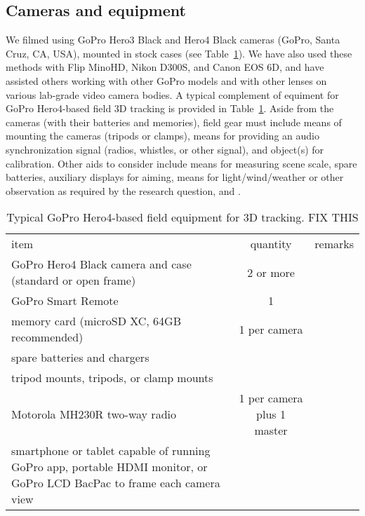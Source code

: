 \documentclass[fleqn,10pt]{wlpeerj}
\begin{document}
\subsection*{Cameras and equipment}
We filmed using GoPro Hero3 Black and Hero4 Black cameras (GoPro, Santa Cruz, CA, USA), mounted in stock cases (see Table~\ref{table:goodies}).  We have also used these methods with Flip MinoHD, Nikon D300S, and Canon EOS 6D, and have assisted others working with other GoPro models and with other lenses on various lab-grade video camera bodies. A typical complement of equiment for GoPro Hero4-based field 3D tracking is provided in Table~\ref{table:goodies}.  Aside from the cameras (with their batteries and memories), field gear must include means of mounting the cameras (tripods or clamps), means for providing an audio synchronization signal (radios, whistles, or other signal), and object(s) for calibration.  Other aids to consider include means for measuring scene scale, spare batteries, auxiliary displays for aiming, means for light/wind/weather or other observation as required by the research question, and .

\begin{table}
\caption{Typical GoPro Hero4-based field equipment for 3D tracking. FIX THIS}
\label{table:goodies}
\begin{center}
\begin{tabular}{lcl}
item & quantity & remarks \\
GoPro Hero4 Black camera and case (standard or open frame) & 2 or more & \\
GoPro Smart Remote & 1 & \\
memory card (microSD XC, 64GB recommended) & 1 per camera & \\
spare batteries and chargers & & \\
tripod mounts, tripods, or clamp mounts & & \\ 
Motorola MH230R two-way radio & 1 per camera plus 1 master & \\
smartphone or tablet capable of running GoPro app, portable HDMI monitor, or GoPro LCD BacPac to frame each camera view & & \\
\end{tabular}
\end{center}
\end{table}
\end{document}

